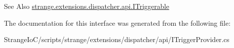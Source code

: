 \begin{DoxySeeAlso}{See Also}
\hyperlink{interfacestrange_1_1extensions_1_1dispatcher_1_1api_1_1_i_triggerable}{strange.\-extensions.\-dispatcher.\-api.\-I\-Triggerable} 
\end{DoxySeeAlso}


The documentation for this interface was generated from the following file\-:\begin{DoxyCompactItemize}
\item 
Strange\-Io\-C/scripts/strange/extensions/dispatcher/api/I\-Trigger\-Provider.\-cs\end{DoxyCompactItemize}
